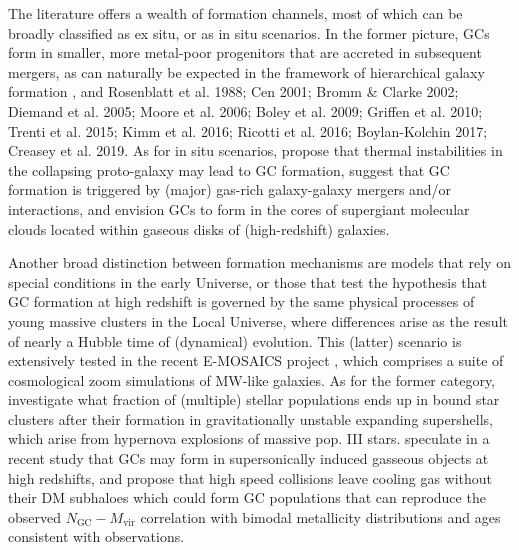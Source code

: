 \documentclass[a4paper,fleqn,usenatbib]{mnras}
\begin{document}
The literature offers a wealth of formation channels, most of which can be broadly
classified as ex situ, or as in situ scenarios. In the former picture, GCs form 
in smaller, more metal-poor progenitors that are accreted in subsequent mergers,
as can naturally be expected in the framework of hierarchical galaxy formation
\citep[e.g.][]{1978ApJ...225..357S, 1984ApJ...277..470P}, and Rosenblatt et al. 1988; 
Cen 2001; Bromm \& Clarke 2002; Diemand et al. 2005; Moore et al. 2006; Boley et al. 2009;
Griffen et al. 2010; Trenti et al. 2015; Kimm et al. 2016; Ricotti et al. 2016;
Boylan-Kolchin 2017; Creasey et al. 2019. As for in situ scenarios,
\citet{1985ApJ...298...18F} propose that thermal instabilities in the collapsing
proto-galaxy may lead to GC formation, \citet{1992ApJ...384...50A, 2010ApJ...718.1266M,
2018MNRAS.480.2343C} suggest that GC formation is triggered by (major) gas-rich
galaxy-galaxy mergers and/or interactions, and \citet{2005ApJ...623..650K} envision
GCs to form in the cores of supergiant molecular clouds located within gaseous disks
of (high-redshift) galaxies.

Another broad distinction between formation mechanisms are models that rely on 
special conditions in the early Universe, or those that test the hypothesis that
GC formation at high redshift is governed by the same physical processes of young 
massive clusters \citep[see][for a review]{2010ARA&A..48..431P} in the Local
Universe, where differences arise as the result of nearly a Hubble time of
(dynamical) evolution. This (latter) scenario is extensively tested in the recent
E-MOSAICS project \citep{2018MNRAS.475.4309P, 2019MNRAS.486.3134K}, which 
comprises a suite of cosmological zoom simulations of MW-like galaxies. As for
the former category, \citet{2017Ap&SS.362..183R} investigate what fraction of 
(multiple) stellar populations ends up in bound star clusters after their
formation in gravitationally unstable expanding supershells, which arise from
hypernova explosions of massive pop. III stars. \citet{2019arXiv190408941C} 
speculate in a recent study that GCs may form in supersonically induced gasseous 
objects at high redshifts, and \citet{2019arXiv190508951M} propose that high speed
collisions leave cooling gas without their DM subhaloes which could form GC 
populations that can reproduce the observed $N_{\text{GC}}-M_{\text{vir}}$
correlation \citep[e.g.][]{2019arXiv190100900B} with bimodal metallicity
distributions and ages consistent with observations.
\end{document}
